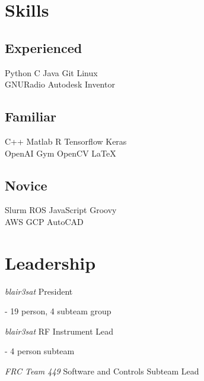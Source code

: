 \documentclass[]{deedy-resume-openfont}
\begin{document}
\begin{minipage}[t]{0.33\textwidth}

\sectionsep
\section{Skills}

\vspace{0.125cm}

\subsection{Experienced}
Python \textbullet{} C \textbullet{} Java \textbullet{} Git \textbullet{} Linux \\
GNURadio \textbullet{} Autodesk Inventor \\
\sectionsep

\subsection{Familiar}
C++ \textbullet{} Matlab \textbullet{} R \textbullet{} Tensorflow \textbullet{} Keras \\
OpenAI Gym \textbullet{} OpenCV \textbullet{} \LaTeX
\sectionsep

\subsection{Novice}
Slurm \textbullet{} ROS \textbullet{} JavaScript \textbullet{} Groovy \\
AWS \textbullet{} GCP \textbullet{} AutoCAD
\sectionsep

\sectionsep
\section{Leadership}

\vspace{0.125cm}

\textit{blair3sat} President

\indent - 19 person, 4 subteam group

\vspace{0.125cm}

\textit{blair3sat} RF Instrument Lead

\indent - 4 person subteam

\vspace{0.125cm}

\textit{FRC Team 449} Software and Controls Subteam Lead


\end{minipage}
\end{document}
